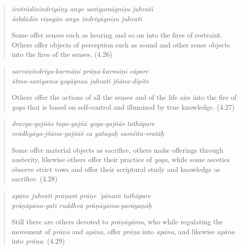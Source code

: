 \documentclass[12pt, twoside, openright]{memoir}
\begin{document}
\par
\begin{verse}
\textit{śrotrādīnīndriyāṇy anye saṁyamāgniṣu juhvati} \\
\textit{śabdādīn viṣayān anya indriyāgniṣu juhvati}

\noindent Some offer senses such as hearing and so on into the fires of restraint. Others offer objects of perception such as sound and other sense objects into the fires of the senses. (4.26)
\end{verse}
\par



\par
\begin{verse}
\textit{sarvāṇīndriya-karmāṇi prāṇa-karmāṇi cāpare} \\
\textit{ātma-saṁyama-yogāgnau juhvati jñāna-dīpite}

\noindent Others offer the actions of all the senses and of the life airs into the fire of \textit{yoga} that is based on self-control and illumined by true knowledge. (4.27)
\end{verse}
\par



\par
\begin{verse}
\textit{dravya-yajñās tapo-yajñā yoga-yajñās tathāpare} \\
\textit{svādhyāya-jñāna-yajñāś ca yatayaḥ saṁśita-vratāḥ}

\noindent Some offer material objects as sacrifice, others make offerings through austerity, likewise others offer their practice of \textit{yoga}, while some ascetics observe strict vows and offer their scriptural study and knowledge as sacrifice. (4.28)
\end{verse}
\par



\par
\begin{verse}
\textit{apāne juhvati prāṇaṁ prāṇe ’pānaṁ tathāpare} \\
\textit{prāṇāpāna-gatī ruddhvā prāṇāyāma-parāyaṇāḥ}

\noindent Still there are others devoted to \textit{prāṇāyāma}, who while regulating the movement of \textit{prāṇa} and \textit{apāna}, offer \textit{prāṇa} into \textit{apāna}, and likewise \textit{apāna} into \textit{prāṇa}. (4.29)
\end{verse}
\par
\end{document}
